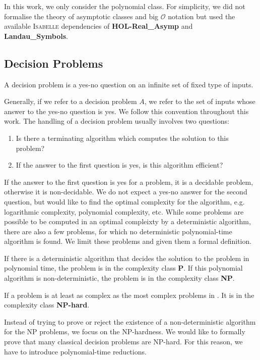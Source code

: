 In this work, we only consider the polynomial class. For simplicity, we did not 
formalise the theory of asymptotic classes and big $\mathcal{O}$ notation but used the 
available \textsc{Isabelle} dependencies of \textbf{HOL-Real\_Asymp} and \textbf{Landau\_Symbols}.

\subsection*{Decision Problems}
\begin{definition}
    A decision problem is a yes-no question on an infinite set of fixed type of inputs.
\end{definition}
Generally, if we refer to a decision problem $A$, we refer to the set of inputs whose answer to the yes-no question is yes. 
We follow this convention throughout this work.
The handling of a decision problem usually involves two questions:
\begin{enumerate}
    \item Is there a terminating algorithm which computes the solution to this problem?
    \item If the answer to the first question is yes, is this algorithm efficient?
\end{enumerate}
If the answer to the first question is yes for a problem, it is a decidable problem, otherwise it is non-decidable. 
We do not expect a yes-no answer for the second question, but would like to find 
the optimal complexity for the algorithm, e.g. logarithmic complexity, polynomial complexity, etc. 
While some problems are possible to be computed in an optimal compleixty by a deterministic algorithm, 
there are also a few problems, for which no deterministic polynomial-time algorithm is found. 
We limit these problems and given them a formal definition.
\begin{definition}
    If there is a deterministic algorithm that decides the solution 
    to the problem in polynomial time, the problem is in the complexity class \textbf{P}.
    If this polynomial algorithm is non-deterministic, the problem is in the complexity class \textbf{NP}. 
\end{definition}
\begin{definition}
If a problem is at least as complex as the most complex problems in \NP. It is 
    in the complexity class \textbf{NP-hard}.
\end{definition}

Instead of trying to prove or reject the existence of a non-deterministic algorithm 
for the NP problems, we focus on the NP-hardness. We would like to formally prove 
that many classical decision problems are NP-hard. For this reason, we have to introduce polynomial-time reductions.


